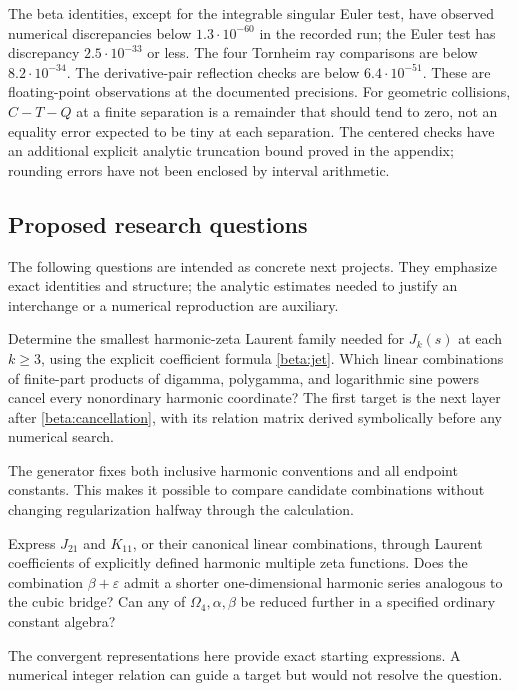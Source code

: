 The beta identities, except for the integrable singular Euler test,
have observed numerical discrepancies below $1.3\cdot10^{-60}$ in the
recorded run; the Euler test has discrepancy $2.5\cdot10^{-33}$ or less.
The four Tornheim ray comparisons are below $8.2\cdot10^{-34}$.
The derivative-pair reflection checks are below $6.4\cdot10^{-51}$.
These are floating-point observations at the documented precisions.
For geometric collisions, $C-T-Q$ at a finite separation is a remainder
that should tend to zero, not an equality error expected to be tiny at
each separation. The centered checks have an additional explicit
analytic truncation bound proved in the appendix; rounding errors have
not been enclosed by interval arithmetic.

\subsection{Proposed research questions}

The following questions are intended as concrete next projects. They
emphasize exact identities and structure; the analytic estimates needed
to justify an interchange or a numerical reproduction are auxiliary.

\begin{question}\label{rq:logs}
Determine the smallest harmonic-zeta Laurent family needed for
$J_k(s)$ at each $k\ge3$, using the explicit coefficient formula
\eqref{beta:jet}. Which linear combinations of finite-part products of
digamma, polygamma, and logarithmic sine powers cancel every nonordinary
harmonic coordinate? The first target is the next layer after
\eqref{beta:cancellation}, with its relation matrix derived symbolically
before any numerical search.
\end{question}
The generator fixes both inclusive harmonic conventions and all
endpoint constants. This makes it possible to compare candidate
combinations without changing regularization halfway through the
calculation.

\begin{question}
Express $J_{21}$ and $K_{11}$, or their canonical linear combinations,
through Laurent coefficients of explicitly defined harmonic multiple
zeta functions. Does the combination $\beta+\varepsilon$ admit a
shorter one-dimensional harmonic series analogous to the cubic bridge?
Can any of $\Omega_4,\alpha,\beta$ be reduced further in a specified
ordinary constant algebra?
\end{question}
The convergent representations here provide exact starting expressions.
A numerical integer relation can guide a target but would not resolve
the question.

